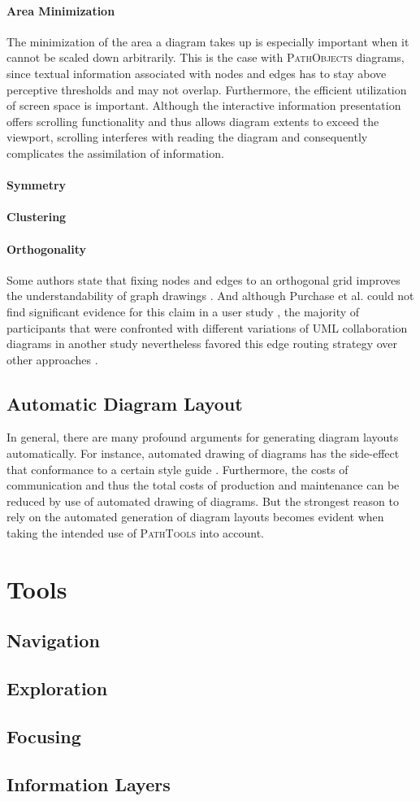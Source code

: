 \paragraph{Area Minimization} The minimization of the area a diagram takes up is especially important when it cannot be scaled down arbitrarily.
This is the case with \textsc{PathObjects} diagrams, since textual information associated with nodes and edges has to stay above perceptive thresholds and may not overlap.
Furthermore, the efficient utilization of screen space is important.
Although the interactive information presentation offers scrolling functionality and thus allows diagram extents to exceed the viewport, scrolling interferes with reading the diagram and consequently complicates the assimilation of information.

\paragraph{Symmetry}

\paragraph{Clustering}

\paragraph{Orthogonality} Some authors state that fixing nodes and edges to an orthogonal grid improves the understandability of graph drawings \cite{sugiyama_methods_1981, batini_what_1985}.
And although Purchase et al. could not find significant evidence for this claim in a user study \cite{purchase_which_1997}, the majority of participants that were confronted with different variations of UML collaboration diagrams in another study nevertheless favored this edge routing strategy over other approaches \cite{purchase_graph_2004}.

\subsection{Automatic Diagram Layout}
In general, there are many profound arguments for generating diagram layouts automatically.
For instance, automated drawing of diagrams has the side-effect that conformance to a certain style guide .
Furthermore, the costs of communication and thus the total costs of production and maintenance can be reduced by use of automated drawing of diagrams.
But the strongest reason to rely on the automated generation of diagram layouts becomes evident when taking the intended use of \textsc{PathTools} into account.


\section{Tools}
\subsection{Navigation}
\subsection{Exploration}
\subsection{Focusing}
\subsection{Information Layers}